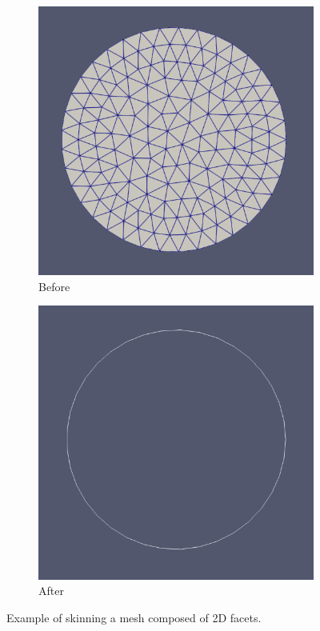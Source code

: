 \documentclass[12pt, letterpaper]{article}
\begin{document}
\begin{figure}
	\begin{subfigure}{0.48\textwidth}
		\includegraphics[width=\linewidth]{processExample/circle.png}
		\caption{Before}
	\end{subfigure}
	\hspace*{\fill}	
	\begin{subfigure}{0.48\textwidth}
		\includegraphics[width=\linewidth]{processExample/skin.png}
		\caption{After}
	\end{subfigure}	
	\caption{Example of skinning a mesh composed of 2D facets.}
	\label{2DSkinningComp}
\end{figure}
\end{document}
